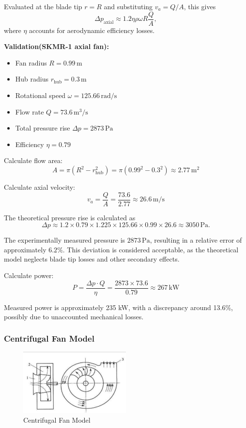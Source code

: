 Evaluated at the blade tip \( r = R \) and substituting \( v_a = Q/A \), this gives
\begin{equation}
\boxed{\Delta p_{\text{axial}} \approx 1.2 \eta \rho \omega R \frac{Q}{A}},
\end{equation}
where \( \eta \) accounts for aerodynamic efficiency losses.

\textbf{Validation(SKMR-1 axial fan):}~\cite{yun1990hovercraft}
\begin{itemize}
    \item Fan radius \( R = 0.99\, \mathrm{m} \)
    \item Hub radius \( r_\mathrm{hub} = 0.3\, \mathrm{m} \)
    \item Rotational speed \(\omega = 125.66\, \mathrm{rad/s} \)
    \item Flow rate \( Q = 73.6\, \mathrm{m^3/s} \)
    \item Total pressure rise \( \Delta p = 2873\, \mathrm{Pa} \)
    \item Efficiency \( \eta = 0.79 \)
\end{itemize}

Calculate flow area:
\[
A = \pi (R^2 - r_\mathrm{hub}^2) = \pi (0.99^2 - 0.3^2) \approx 2.77\, \mathrm{m^2}
\]

Calculate axial velocity:
\[
v_a = \frac{Q}{A} = \frac{73.6}{2.77} \approx 26.6\, \mathrm{m/s}
\]

The theoretical pressure rise is calculated as
\[
\Delta p \approx 1.2 \times 0.79 \times 1.225 \times 125.66 \times 0.99 \times 26.6 \approx 3050\, \mathrm{Pa}.
\]

The experimentally measured pressure is \( 2873\, \mathrm{Pa} \), resulting in a relative error of approximately \( 6.2\% \). This deviation is considered acceptable, as the theoretical model neglects blade tip losses and other secondary effects.

Calculate power:
\[
P = \frac{\Delta p \cdot Q}{\eta} = \frac{2873 \times 73.6}{0.79} \approx 267\, \mathrm{kW}
\]

Measured power is approximately 235 kW, with a discrepancy around 13.6\%, possibly due to unaccounted mechanical losses.

\subsubsection{Centrifugal Fan Model}

\begin{figure}[H]
  \centering
  \includegraphics[width=0.5\textwidth]{images/CentrifugalFan.png}
  \caption{Centrifugal Fan Model}
  \label{fig:Centrifugal Fan Model}
\end{figure}

